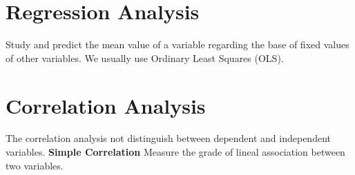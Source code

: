 \documentclass[10pt,landscape]{article}
\begin{document}
\begin{multicols}{3}
\section*{Regression Analysis}
Study and predict the mean value of a variable regarding the base of fixed values of other variables.
We usually use Ordinary Least Squares (OLS).

\section*{Correlation Analysis}
The correlation analysis not distinguish between dependent and independent variables.
\textbf{Simple Correlation}
Measure the grade of lineal association between two variables.

\end{multicols}
\end{document}
